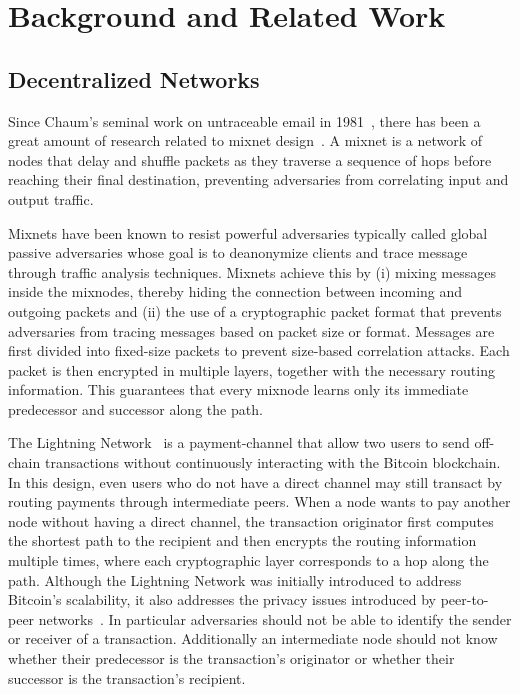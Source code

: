 \section{Background and Related Work}\label{sec:related}

\subsection{Decentralized Networks}
Since Chaum's seminal work on untraceable email in 1981~\cite{chaum-mix}, there has been a great amount of research related to mixnet design~\cite{piotrowska2017loopix, van2015vuvuzela, kwon2020xrd, lazar2018karaoke, cottrell1995mixmaster, alexopoulos2017MCMIX, chaum2016cmix, chaum-mix, danezis2003mixminion}. 
A mixnet is a network of nodes that delay and shuffle packets as they traverse a sequence of hops before reaching their final destination, preventing adversaries from correlating input and output traffic.

Mixnets have been known to resist powerful adversaries typically called global passive adversaries whose goal is to deanonymize clients and trace message through traffic analysis techniques. 
Mixnets achieve this by (i) mixing messages inside the mixnodes, thereby hiding the connection between incoming and outgoing packets and (ii) the use of a cryptographic packet format that prevents adversaries from tracing messages based on packet size or format. 
Messages are first divided into fixed-size packets to prevent size-based correlation attacks. 
Each packet is then encrypted in multiple layers, together with the necessary routing information. 
This guarantees that every mixnode learns only its immediate predecessor and successor along the path.

The Lightning Network~\cite{poon2016bitcoin} is a payment-channel that allow two users to send off-chain transactions without continuously interacting with the Bitcoin blockchain. 
In this design, even users who do not have a direct channel may still transact by routing payments through intermediate peers. 
When a node wants to pay another node without having a direct channel, the transaction originator first computes the shortest path to the recipient and then encrypts the routing information multiple times, where each cryptographic layer corresponds to a hop along the path.
Although the Lightning Network was initially introduced to address Bitcoin's scalability, it also addresses the privacy issues introduced by peer-to-peer networks~\cite{sharma2022anonymity}. 
In particular adversaries should not be able to identify the sender or receiver of a transaction. 
Additionally an intermediate node should not know whether their predecessor is the transaction's originator or whether their successor is the transaction's recipient. 

